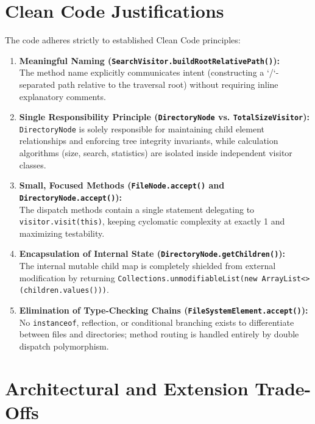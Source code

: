 \documentclass[11pt,a4paper]{article}
\begin{document}
\newpage

\section{Clean Code Justifications}
The code adheres strictly to established Clean Code principles:

\begin{enumerate}\itemsep 4pt
    \item \textbf{Meaningful Naming (\texttt{SearchVisitor.buildRootRelativePath()}):}\\
    The method name explicitly communicates intent (constructing a `/`-separated path relative to the traversal root) without requiring inline explanatory comments.
    \item \textbf{Single Responsibility Principle (\texttt{DirectoryNode} vs. \texttt{TotalSizeVisitor}):}\\
    \texttt{DirectoryNode} is solely responsible for maintaining child element relationships and enforcing tree integrity invariants, while calculation algorithms (size, search, statistics) are isolated inside independent visitor classes.
    \item \textbf{Small, Focused Methods (\texttt{FileNode.accept()} and \texttt{DirectoryNode.accept()}):}\\
    The dispatch methods contain a single statement delegating to \texttt{visitor.visit(this)}, keeping cyclomatic complexity at exactly 1 and maximizing testability.
    \item \textbf{Encapsulation of Internal State (\texttt{DirectoryNode.getChildren()}):}\\
    The internal mutable child map is completely shielded from external modification by returning \texttt{Collections.unmodifiableList(new ArrayList<>(children.values()))}.
    \item \textbf{Elimination of Type-Checking Chains (\texttt{FileSystemElement.accept()}):}\\
    No \texttt{instanceof}, reflection, or conditional branching exists to differentiate between files and directories; method routing is handled entirely by double dispatch polymorphism.
\end{enumerate}

\section{Architectural and Extension Trade-Offs}
\end{document}
